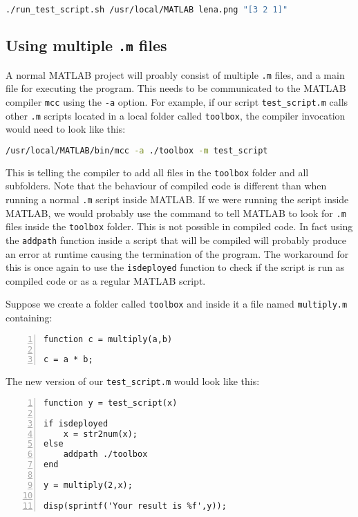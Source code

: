 \begin{lstlisting}[language=bash]
./run_test_script.sh /usr/local/MATLAB lena.png "[3 2 1]" 
\end{lstlisting}

\subsection{Using multiple \texttt{.m} files}

A normal MATLAB project will proably consist of multiple \texttt{.m} files, and
a main file for executing the program. This needs to be communicated to the
MATLAB compiler \texttt{mcc} using the \texttt{-a} option.  For example, if our
script \texttt{test\_script.m} calls other \texttt{.m} scripts located in a
local folder called \texttt{toolbox}, the compiler invocation would need to look like
this:

\begin{lstlisting}[language=bash]
/usr/local/MATLAB/bin/mcc -a ./toolbox -m test_script
\end{lstlisting}

This is telling the compiler to add all files in the \texttt{toolbox} folder and
all subfolders. Note that the behaviour of compiled code is different than when
running a normal \texttt{.m} script inside MATLAB. If we were running the script
inside MATLAB, we would probably use the command  to
tell MATLAB to look for \texttt{.m} files inside the \texttt{toolbox}
folder. This is not possible in compiled code. In fact using the
\texttt{addpath} function inside a script that will be compiled will probably
produce an error at runtime causing the termination of the program. The
workaround for this is once again to use the \texttt{isdeployed} function to
check if the script is run as compiled code or as a regular MATLAB script.

Suppose we create a folder called \texttt{toolbox} and inside it a file named \texttt{multiply.m} containing:

\begin{lstlisting}[numbers=left,title={\texttt{multiply.m}},captionpos=b]
function c = multiply(a,b)

c = a * b;
\end{lstlisting}

The new version of our \texttt{test\_script.m} would look like this:

\begin{lstlisting}[numbers=left,title={Third version of \texttt{test\_script.m}},captionpos=b]
function y = test_script(x)

if isdeployed
    x = str2num(x);
else
    addpath ./toolbox
end

y = multiply(2,x);

disp(sprintf('Your result is %f',y));
\end{lstlisting}

